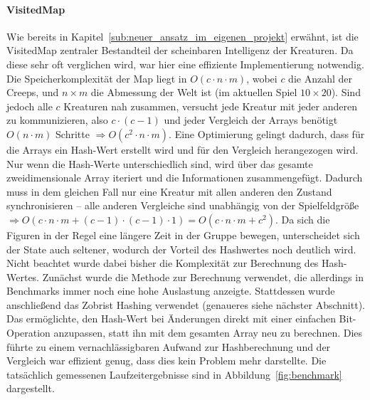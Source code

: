 \paragraph{VisitedMap} Wie bereits in Kapitel~\ref{sub:neuer_ansatz_im_eigenen_projekt} erwähnt, ist die VisitedMap zentraler Bestandteil der scheinbaren Intelligenz der Kreaturen. Da diese sehr oft verglichen wird, war hier eine effiziente Implementierung notwendig. Die Speicherkomplexität der Map liegt in \(O (c\cdot n \cdot m)\), wobei \(c\) die Anzahl der Creeps, und \(n\times m\) die Abmessung der Welt ist (im aktuellen Spiel \(10\times20\)). Sind jedoch alle \(c\) Kreaturen nah zusammen, versucht jede Kreatur mit jeder anderen zu kommunizieren, also \(c\cdot (c-1)\) und jeder Vergleich der Arrays benötigt \(O(n\cdot m)\) Schritte \(\Rightarrow O(c^2\cdot n\cdot m)\). Eine Optimierung gelingt dadurch, dass für die Arrays ein Hash-Wert erstellt wird und für den Vergleich herangezogen wird. Nur wenn die Hash-Werte unterschiedlich sind, wird über das gesamte zweidimensionale Array iteriert und die Informationen zusammengefügt. Dadurch muss in dem gleichen Fall nur eine Kreatur mit allen anderen den Zustand synchronisieren -- alle anderen Vergleiche sind unabhängig von der Spielfeldgröße \(\Rightarrow O(c\cdot n \cdot m + (c-1)\cdot(c-1)\cdot1) = O(c \cdot n \cdot m + c^2) \). Da sich die Figuren in der Regel eine längere Zeit in der Gruppe bewegen, unterscheidet sich der State auch seltener, wodurch der Vorteil des Hashwertes noch deutlich wird. Nicht beachtet wurde dabei bisher die Komplexität zur Berechnung des Hash-Wertes. Zunächst wurde die Methode  zur Berechnung verwendet, die allerdings in Benchmarks immer noch eine hohe Auslastung anzeigte. Stattdessen wurde anschließend das Zobrist Hashing  verwendet (genaueres siehe nächster Abschnitt). Das ermöglichte, den Hash-Wert bei Änderungen direkt mit einer einfachen Bit-Operation anzupassen, statt ihn mit dem gesamten Array neu zu berechnen. Dies führte zu einem vernachlässigbaren Aufwand zur Hashberechnung und der Vergleich war effizient genug, dass dies kein Problem mehr darstellte. Die tatsächlich gemessenen Laufzeitergebnisse sind in Abbildung~\ref{fig:benchmark} dargestellt.
